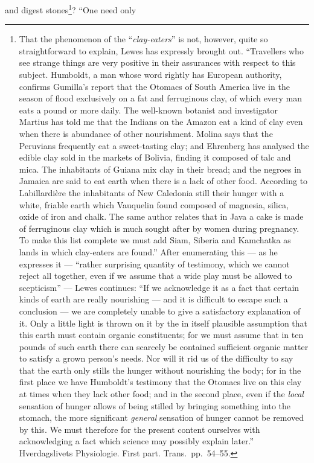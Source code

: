 \documentclass[12pt,a4paper]{book}
\begin{document}
and digest stones\footnote{That the phenomenon of the
``\emph{clay-eaters}'' is not, however, quite so straightforward to explain,
Lewes has expressly brought out. ``Travellers who see strange things are very
positive in their assurances with respect to this subject. Humboldt, a man
whose word rightly has European authority, confirms Gumilla's report that the
Otomacs of South America live in the season of flood exclusively on a fat and
ferruginous clay, of which every man eats a pound or more daily. The well-known
botanist and investigator Martius has told me that the Indians on the Amazon
eat a kind of clay even when there is abundance of other nourishment. Molina
says that the Peruvians frequently eat a sweet-tasting clay; and Ehrenberg has
analysed the edible clay sold in the markets of Bolivia, finding it composed of
talc and mica. The inhabitants of Guiana mix clay in their bread; and the
negroes in Jamaica are said to eat earth when there is a lack of other food.
According to Labillardière the inhabitants of New Caledonia still their hunger
with a white, friable earth which Vauquelin found composed of magnesia, silica,
oxide of iron and chalk. The same author relates that in Java a cake is made of
ferruginous clay which is much sought after by women during pregnancy. To make
this list complete we must add Siam, Siberia and Kamchatka as lands in which
clay-eaters are found.'' After enumerating this --- as he expresses it ---
``rather surprising quantity of testimony, which we cannot reject all together,
even if we assume that a wide play must be allowed to scepticism'' --- Lewes
continues: ``If we acknowledge it as a fact that certain kinds of earth are
really nourishing --- and it is difficult to escape such a conclusion --- we
are completely unable to give a satisfactory explanation of it. Only a little
light is thrown on it by the in itself plausible assumption that this earth
must contain organic constituents; for we must assume that in ten pounds of
such earth there can scarcely be contained sufficient organic matter to satisfy
a grown person's needs. Nor will it rid us of the difficulty to say that the
earth only stills the hunger without nourishing the body; for in the first
place we have Humboldt's testimony that the Otomacs live on this clay at times
when they lack other food; and in the second place, even if the \emph{local}
sensation of hunger allows of being stilled by bringing something into the
stomach, the more significant \emph{general} sensation of hunger cannot
be removed by this. We must therefore for the present content ourselves with
acknowledging a fact which science may possibly explain later.''
Hverdagslivets Physiologie. First part. Trans.\ pp.~54--55.}? ``One need only
\end{document}
